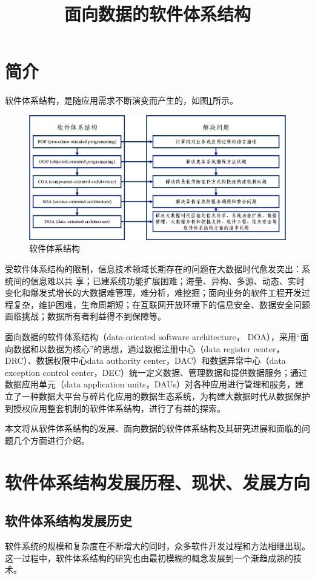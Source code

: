 \documentclass[article]{BJTU-thesis}
\title{面向数据的软件体系结构}
\begin{document}
	\makecover
	
	\tableofcontents
	\newpage

	\newpage
	\setcounter{page}{1}
	\section{简介}
	
	软件体系结构，是随应用需求不断演变而产生的，如图\ref{fig:fig0}所示。
	\begin{figure}[!htbp]
		\centering
		\includegraphics[width=1\textwidth]{0.png}
		\caption{软件体系结构}
		\label{fig:fig0}
	\end{figure}

	受软件体系结构的限制，信息技术领域长期存在的问题在大数据时代愈发突出：系统间的信息难以共
	享；已建系统功能扩展困难；海量、异构、多源、动态、实时变化和爆发式增长的大数据难管理，难分析，难挖掘；面向业务的软件工程开发过程复杂，维护困难，生命周期短；在互联网开放环境下的信息安全、数据安全问题面临挑战；数据所有者利益得不到保障等。
	
	面向数据的软件体系结构（data-oriented software architecture，
	DOA），采用“面向数据和以数据为核心”的思想，通过数据注册中心（data register center，DRC）、数据权限中心data authority center，DAC）和数据异常中心（data exception control center，DEC）统一定义数据、管理数据和提供数据服务；通过数据应用单元（data application units，DAUs）对各种应用进行管理和服务，建立了一种数据大平台与碎片化应用的数据生态系统，为构建大数据时代从数据保护到授权应用整套机制的软件体系结构，进行了有益的探索。
	
	本文将从软件体系结构的发展、面向数据的软件体系结构及其研究进展和面临的问题几个方面进行介绍。
	
	\section{软件体系结构发展历程、现状、发展方向}
	\subsection{软件体系结构发展历史}
	软件系统的规模和复杂度在不断增大的同时，众多软件开发过程和方法相继出现。这一过程中，软件体系结构的研究也由最初模糊的概念发展到一个渐趋成熟的技术。
	
\end{document}
